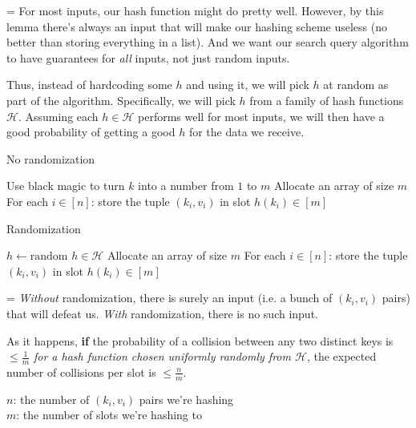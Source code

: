 \documentclass[11pt]{article}
\begin{document}
{\parskip=\baselineskip
For most inputs, our hash function might do pretty well. However, by this lemma there's always an input that will make our hashing scheme useless (no better than storing everything in a list). And we want our search query algorithm to have guarantees for \textit{all} inputs, not just random inputs.

Thus, instead of hardcoding some $h$ and using it, we will pick $h$ at random as part of the algorithm. Specifically, we will pick $h$ from a family of hash functions $\mathcal{H}$. Assuming each $h \in \mathcal{H}$ performs well for most inputs, we will then have a good probability of getting a good $h$ for the data we receive.

\begin{algorithm}
\caption{No randomization}
\begin{algorithmic}[1]
\State Use black magic to turn $k$ into a number from $1$ to $m$
\EndProcedure
{}
\State Allocate an array of size $m$
\State For each $i \in [n]$: store the tuple $(k_i, v_i)$ in slot $h(k_i) \in [m]$
\EndProcedure
\end{algorithmic}
\end{algorithm}

\begin{algorithm}
\caption{Randomization}
\begin{algorithmic}[1]
\State $h \gets \text{random $h \in \mathcal{H}$}$
\State Allocate an array of size $m$
\State For each $i \in [n]$: store the tuple $(k_i, v_i)$ in slot $h(k_i) \in [m]$
\EndProcedure
\end{algorithmic}
\end{algorithm}
}

{\parskip=\baselineskip
\textit{Without} randomization, there is surely an input (i.e. a bunch of $(k_i, v_i)$ pairs) that will defeat us.
\textit{With} randomization, there is no such input.

As it happens, \textbf{if} the probability of a collision between any two distinct keys is $\leq \frac{1}{m}$ \textit{for a hash function chosen uniformly randomly from $\mathcal{H}$}, the expected number of collisions per slot is $\leq \frac{n}{m}$.
}

\begin{flushright}
$n$: the number of $(k_i, v_i)$ pairs we're hashing \\
$m$: the number of slots we're hashing to
\end{flushright}
\end{document}
